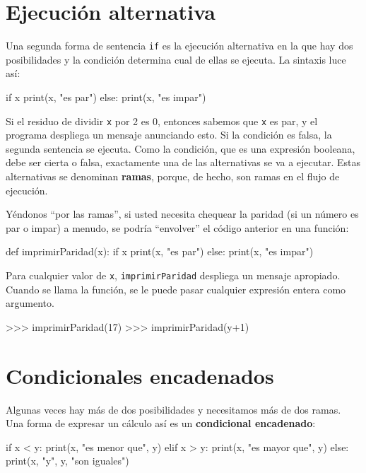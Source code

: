 \section{Ejecución alternativa}

\label{alternative execution2}

Una segunda forma de sentencia \texttt{if} es la ejecución alternativa
en la que hay dos posibilidades y la condición determina cual de ellas
se ejecuta. La sintaxis luce así:
\begin{pythoncode}
if x%
  print(x, "es par")
else:
  print(x, "es impar")
\end{pythoncode}

Si el residuo de dividir \texttt{x} por 2 es 0, entonces sabemos que
\texttt{x} es par, y el programa despliega un mensaje anunciando esto.
Si la condición es falsa, la segunda sentencia se ejecuta. Como la
condición, que es una expresión booleana, debe ser cierta o falsa,
exactamente una de las alternativas se va a ejecutar. Estas alternativas
se denominan \textbf{ramas}, porque, de hecho, son ramas en el flujo
de ejecución.


Yéndonos ``por las ramas'', si usted necesita chequear la paridad
(si un número es par o impar) a menudo, se podría ``envolver'' el
código anterior en una función:
\begin{pythoncode}
def imprimirParidad(x):
  if x%
    print(x, "es par")
  else:
    print(x, "es impar")
\end{pythoncode}

Para cualquier valor de \texttt{x}, \texttt{imprimirParidad} despliega
un mensaje apropiado. Cuando se llama la función, se le puede pasar
cualquier expresión entera como argumento.
\begin{pythoncode}
>>> imprimirParidad(17)
>>> imprimirParidad(y+1)
\end{pythoncode}

\section{Condicionales encadenados}

 

Algunas veces hay más de dos posibilidades y necesitamos más de dos
ramas. Una forma de expresar un cálculo así es un \textbf{condicional
encadenado}:

\begin{pythoncode}
if x < y:
  print(x, "es menor que", y)
elif x > y:
  print(x, "es mayor que", y)
else:
  print(x, "y", y, "son iguales")
\end{pythoncode}

